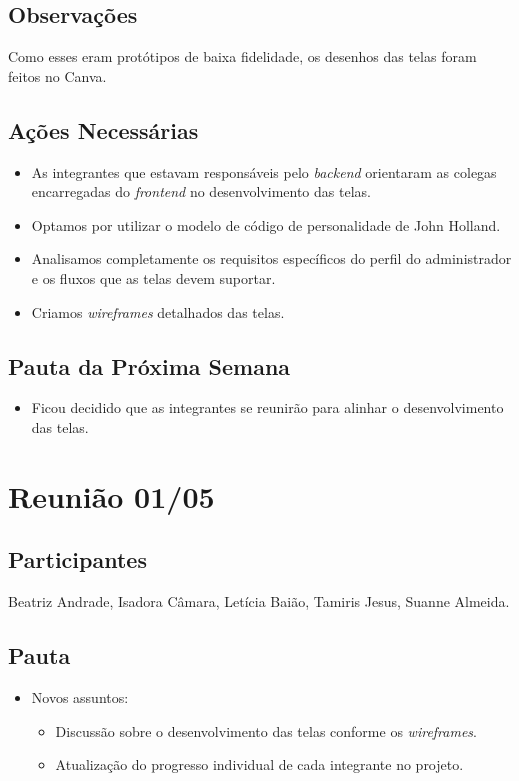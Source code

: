 \begin{apendicesenv}
\subsection*{Observações}
Como esses eram protótipos de baixa fidelidade, os desenhos das telas foram feitos no Canva.

\subsection*{Ações Necessárias}
\begin{itemize}
    \item As integrantes que estavam responsáveis pelo \textit{backend} orientaram as colegas encarregadas do \textit{frontend} no desenvolvimento das telas.
    \item Optamos por utilizar o modelo de código de personalidade de John Holland.
    \item Analisamos completamente os requisitos específicos do perfil do administrador e os fluxos que as telas devem suportar.
    \item Criamos \textit{wireframes} detalhados das telas.
\end{itemize}

\subsection*{Pauta da Próxima Semana}
\begin{itemize}
    \item Ficou decidido que as integrantes se reunirão para alinhar o desenvolvimento das telas.
\end{itemize}

\section*{Reunião 01/05}

\subsection*{Participantes}
Beatriz Andrade, Isadora Câmara, Letícia Baião, Tamiris Jesus, Suanne Almeida.

\subsection*{Pauta}
\begin{itemize}
    \item Novos assuntos:
    \begin{itemize}
        \item Discussão sobre o desenvolvimento das telas conforme os \textit{wireframes}.
        \item Atualização do progresso individual de cada integrante no projeto.
    \end{itemize}
\end{itemize}


\end{apendicesenv}
